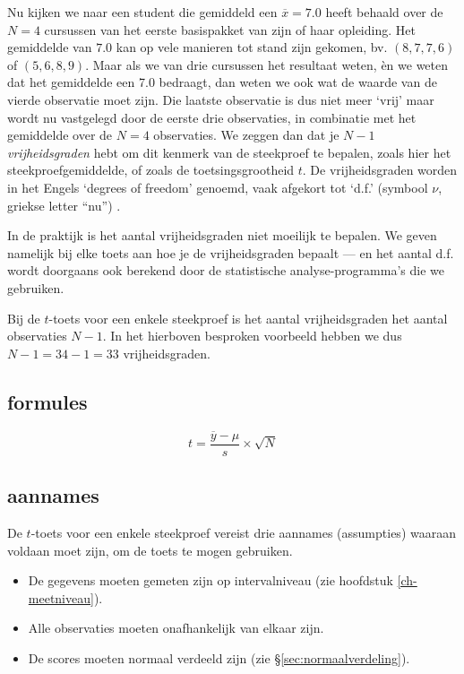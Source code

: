 \documentclass[
]{book}
\begin{document}
Nu kijken we naar een student die gemiddeld een \(\overline{x}=7.0\) heeft
behaald over de \(N=4\) cursussen van het eerste basispakket van zijn of
haar opleiding. Het gemiddelde van \(7.0\) kan op vele manieren tot stand
zijn gekomen, bv. \((8,7,7,6)\) of \((5,6,8,9)\). Maar als we van drie
cursussen het resultaat weten, èn we weten dat het gemiddelde een 7.0
bedraagt, dan weten we ook wat de waarde van de vierde observatie moet
zijn. Die laatste observatie is dus niet meer `vrij' maar wordt nu
vastgelegd door de eerste drie observaties, in combinatie met het
gemiddelde over de \(N=4\) observaties. We zeggen dan dat je \(N-1\)
\emph{vrijheidsgraden} hebt om dit kenmerk van de steekproef te bepalen,
zoals hier het steekproefgemiddelde, of zoals de toetsingsgrootheid \(t\).
De vrijheidsgraden worden in het Engels `degrees of freedom' genoemd,
vaak afgekort tot `d.f.' (symbool \(\nu\), griekse letter ``nu'') .

In de praktijk is het aantal vrijheidsgraden niet moeilijk te bepalen.
We geven namelijk bij elke toets aan hoe je de vrijheidsgraden bepaalt
--- en het aantal d.f. wordt doorgaans ook berekend door de statistische
analyse-programma's die we gebruiken.

Bij de \(t\)-toets voor een enkele steekproef is het aantal
vrijheidsgraden het aantal observaties \(N-1\). In het hierboven besproken
voorbeeld hebben we dus \(N-1 = 34-1 = 33\) vrijheidsgraden.

\subsection{formules}\label{sec:formules13-1}

\begin{equation}
  t = \frac{ \overline{y}-\mu} { s } \times \sqrt{N}
  \label{eq:t-onesample}
\end{equation}

\subsection{aannames}\label{sec:ttoets-aannames}

De \(t\)-toets voor een enkele steekproef vereist drie aannames
(assumpties) waaraan voldaan moet zijn, om de toets te mogen gebruiken.

\begin{itemize}
\item
  De gegevens moeten gemeten zijn op intervalniveau (zie hoofdstuk
  \ref{ch-meetniveau}).
\item
  Alle observaties moeten onafhankelijk van elkaar zijn.
\item
  De scores moeten normaal verdeeld zijn (zie
  §\ref{sec:normaalverdeling}).
\end{itemize}
\end{document}
